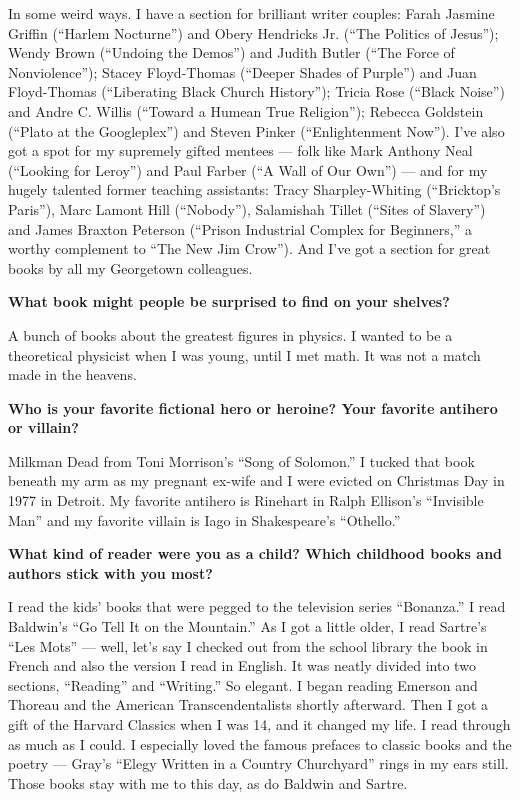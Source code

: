 In some weird ways. I have a section for brilliant writer couples: Farah
Jasmine Griffin (``Harlem Nocturne'') and Obery Hendricks Jr. (``The
Politics of Jesus''); Wendy Brown (``Undoing the Demos'') and Judith
Butler (``The Force of Nonviolence''); Stacey Floyd-Thomas (``Deeper
Shades of Purple'') and Juan Floyd-Thomas (``Liberating Black Church
History''); Tricia Rose (``Black Noise'') and Andre C. Willis (``Toward
a Humean True Religion''); Rebecca Goldstein (``Plato at the
Googleplex'') and Steven Pinker (``Enlightenment Now''). I've also got a
spot for my supremely gifted mentees --- folk like Mark Anthony Neal
(``Looking for Leroy'') and Paul Farber (``A Wall of Our Own'') --- and
for my hugely talented former teaching assistants: Tracy
Sharpley-Whiting (``Bricktop's Paris''), Marc Lamont Hill (``Nobody''),
Salamishah Tillet (``Sites of Slavery'') and James Braxton Peterson
(``Prison Industrial Complex for Beginners,'' a worthy complement to
``The New Jim Crow''). And I've got a section for great books by all my
Georgetown colleagues.

\textbf{What book might people be surprised to find on your shelves?}

A bunch of books about the greatest figures in physics. I wanted to be a
theoretical physicist when I was young, until I met math. It was not a
match made in the heavens.

\textbf{Who is your favorite fictional hero or heroine? Your favorite
antihero or villain?}

Milkman Dead from Toni Morrison's ``Song of Solomon.'' I tucked that
book beneath my arm as my pregnant ex-wife and I were evicted on
Christmas Day in 1977 in Detroit. My favorite antihero is Rinehart in
Ralph Ellison's ``Invisible Man'' and my favorite villain is Iago in
Shakespeare's ``Othello.''

\textbf{What kind of reader were you as a child? Which childhood books
and authors stick with you most?}

I read the kids' books that were pegged to the television series
``Bonanza.'' I read Baldwin's ``Go Tell It on the Mountain.'' As I got a
little older, I read Sartre's ``Les Mots'' --- well, let's say I checked
out from the school library the book in French and also the version I
read in English. It was neatly divided into two sections, ``Reading''
and ``Writing.'' So elegant. I began reading Emerson and Thoreau and the
American Transcendentalists shortly afterward. Then I got a gift of the
Harvard Classics when I was 14, and it changed my life. I read through
as much as I could. I especially loved the famous prefaces to classic
books and the poetry --- Gray's ``Elegy Written in a Country
Churchyard'' rings in my ears still. Those books stay with me to this
day, as do Baldwin and Sartre.

